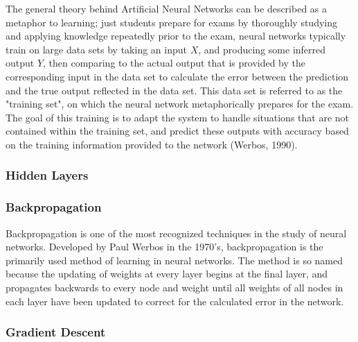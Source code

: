 \documentclass{article}
\begin{document}
The general theory behind Artificial Neural Networks can be described as a metaphor to learning; just students prepare for exams by thoroughly studying and applying knowledge repeatedly prior to the exam, neural networks typically train on large data sets by taking an input $X$, and producing some inferred output $Y$, then comparing to the actual output that is provided by the corresponding input in the data set to calculate the error between the prediction and the true output reflected in the data set. This data set is referred to as the "training set", on which the neural network  metaphorically prepares for the exam. The goal of this training is to adapt the system to handle situations that are not contained within the training set, and predict these outputs with accuracy based on the training information provided to the network (Werbos, 1990).\par

\subsubsection{Hidden Layers}

\subsubsection{Backpropagation}
Backpropagation is one of the most recognized techniques in the study of neural networks. Developed by Paul Werbos in the 1970's, backpropagation is the primarily used method of learning in neural networks. The method is so named because the updating of weights at every layer begins at the final layer, and propagates backwards to every node and weight until all weights of all nodes in each layer have been updated to correct for the calculated error in the network.

\subsubsection{Gradient Descent}
\end{document}
